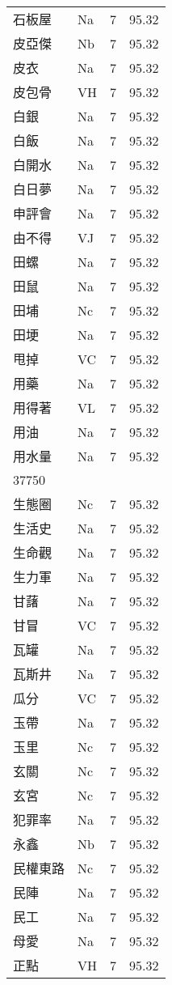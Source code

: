 \documentclass[twocolumn]{book}
\begin{document}
\begin{supertabular}{llrr}
石板屋 & Na & 7 &  95.32\\
皮亞傑 & Nb & 7 &  95.32\\
皮衣 & Na & 7 &  95.32\\
皮包骨 & VH & 7 &  95.32\\
白銀 & Na & 7 &  95.32\\
白飯 & Na & 7 &  95.32\\
白開水 & Na & 7 &  95.32\\
白日夢 & Na & 7 &  95.32\\
申評會 & Na & 7 &  95.32\\
由不得 & VJ & 7 &  95.32\\
田螺 & Na & 7 &  95.32\\
田鼠 & Na & 7 &  95.32\\
田埔 & Nc & 7 &  95.32\\
田埂 & Na & 7 &  95.32\\
甩掉 & VC & 7 &  95.32\\
用藥 & Na & 7 &  95.32\\
用得著 & VL & 7 &  95.32\\
用油 & Na & 7 &  95.32\\
用水量 & Na & 7 &  95.32\\
37750\\
生態圈 & Nc & 7 &  95.32\\
生活史 & Na & 7 &  95.32\\
生命觀 & Na & 7 &  95.32\\
生力軍 & Na & 7 &  95.32\\
甘藷 & Na & 7 &  95.32\\
甘冒 & VC & 7 &  95.32\\
瓦罐 & Na & 7 &  95.32\\
瓦斯井 & Na & 7 &  95.32\\
瓜分 & VC & 7 &  95.32\\
玉帶 & Na & 7 &  95.32\\
玉里 & Nc & 7 &  95.32\\
玄關 & Nc & 7 &  95.32\\
玄宮 & Nc & 7 &  95.32\\
犯罪率 & Na & 7 &  95.32\\
永鑫 & Nb & 7 &  95.32\\
民權東路 & Nc & 7 &  95.32\\
民陣 & Na & 7 &  95.32\\
民工 & Na & 7 &  95.32\\
母愛 & Na & 7 &  95.32\\
正點 & VH & 7 &  95.32\\

\end{supertabular}
\end{document}
